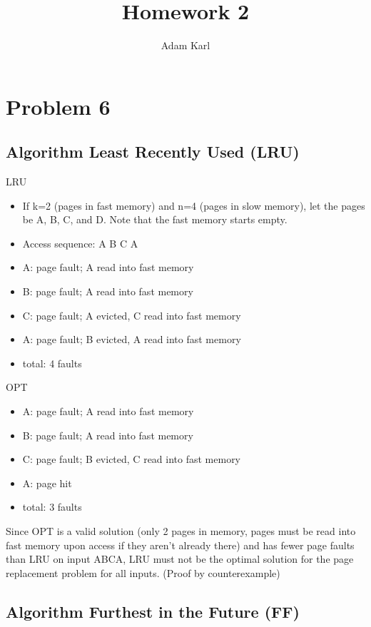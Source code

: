 \documentclass[a4paper]{article}
\title{Homework 2}
\author{Adam Karl}
\begin{document}
\maketitle


\section{Problem 6}
\subsection{Algorithm Least Recently Used (LRU)}



LRU
\begin{itemize}
\item If k=2 (pages in fast memory) and n=4 (pages in slow memory), let the pages be A, B, C, and D. Note that the fast memory starts empty.
\item Access sequence: A B C A
\item A: page fault; A read into fast memory
\item B: page fault; A read into fast memory
\item C: page fault; A evicted, C read into fast memory
\item A: page fault; B evicted, A read into fast memory
\item total: 4 faults
\end{itemize}

OPT
\begin{itemize}
\item A: page fault; A read into fast memory
\item B: page fault; A read into fast memory
\item C: page fault; B evicted, C read into fast memory
\item A: page hit
\item total: 3 faults
\end{itemize}

Since OPT is a valid solution (only 2 pages in memory, pages must be read into fast memory upon access if they aren't already there) and has fewer page faults than LRU on input ABCA, LRU must not be the optimal solution for the page replacement problem for all inputs. (Proof by counterexample)

\subsection{Algorithm Furthest in the Future (FF)}
\end{document}
